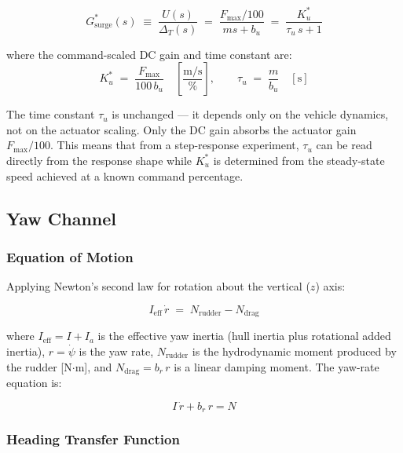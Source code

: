 \documentclass[../../book.tex]{subfiles}
\begin{document}
\begin{equation}
  G_{\mathrm{surge}}^*(s)
  \;\equiv\; \frac{U(s)}{\Delta_T(s)}
  \;=\; \frac{F_{\max}/100}{ms + b_u}
  \;=\; \frac{K_u^*}{\tau_u\,s + 1}
  \label{eq:Gsurge_cmd}
\end{equation}

where the command-scaled DC gain and time constant are:
\[
  K_u^* \;=\; \frac{F_{\max}}{100\,b_u}
  \quad \left[\frac{\mathrm{m/s}}{\%}\right],
  \qquad
  \tau_u \;=\; \frac{m}{b_u} \quad [\mathrm{s}]
\]

The time constant $\tau_u$ is unchanged --- it depends only on the vehicle
dynamics, not on the actuator scaling.  Only the DC gain absorbs the
actuator gain $F_{\max}/100$.  This means that from a step-response
experiment, $\tau_u$ can be read directly from the response shape while
$K_u^*$ is determined from the steady-state speed achieved at a known
command percentage.

\subsection{Yaw Channel}

\subsubsection{Equation of Motion}

Applying Newton's second law for rotation about the vertical ($z$) axis:

\begin{equation}
  I_{\mathrm{eff}}\,\dot{r} \;=\; N_{\mathrm{rudder}} - N_{\mathrm{drag}}
  \label{eq:yaw_newton}
\end{equation}

where $I_{\mathrm{eff}} = I + I_a$ is the effective yaw inertia (hull
inertia plus rotational added inertia), $r = \dot\psi$ is the yaw rate,
$N_{\mathrm{rudder}}$ is the hydrodynamic moment produced by the rudder
[N$\cdot$m], and $N_{\mathrm{drag}} = b_r\,r$ is a linear damping moment.
The yaw-rate equation is:

\begin{equation}
  \boxed{I\,\dot{r} + b_r\,r = N}
  \label{eq:yaw_eom}
\end{equation}

\subsubsection{Heading Transfer Function}
\end{document}
